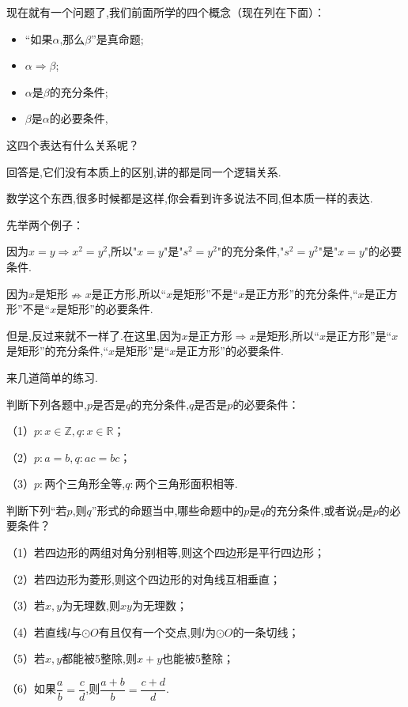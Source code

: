 \documentclass[lang=cn,math=cm,chinesefont=nofont,11pt,scheme=chinese,twocol]{elegantbook}
\begin{document}
现在就有一个问题了,我们前面所学的四个概念（现在列在下面）：
\begin{itemize}
  \item “如果$\alpha$,那么$\beta$”是真命题;
  \item $\alpha\Rightarrow\beta$;
  \item $\alpha$是$\beta$的充分条件;
  \item $\beta$是$\alpha$的必要条件,
\end{itemize}

这四个表达有什么关系呢？

回答是,它们没有本质上的区别,讲的都是同一个逻辑关系.

数学这个东西,很多时候都是这样,你会看到许多说法不同,但本质一样的表达.

\hspace*{\fill}

先举两个例子：

\begin{example}\label{202406262001}
  因为$x=y\Rightarrow x^2=y^2$,所以"$x=y$"是"$s^2=y^2$"的充分条件,"$s^2=y^2$"是"$x=y$"的必要条件.
\end{example}

\begin{example}\label{202406262002}
  因为$x$是矩形$\nRightarrow x$是正方形,所以“$x$是矩形”不是“$x$是正方形”的充分条件,“$x$是正方形”不是“$x$是矩形”的必要条件.

  但是,反过来就不一样了.在这里,因为$x$是正方形$\Rightarrow x$是矩形,所以“$x$是正方形”是“$x$是矩形”的充分条件,“$x$是矩形”是“$x$是正方形”的必要条件.
\end{example}

来几道简单的练习.

\begin{exercise}\label{202406262010}
  判断下列各题中,$p$是否是$q$的充分条件,$q$是否是$p$的必要条件：

  （1）$p:x\in\mathbb{Z},q:x\in\mathbb{R}$；

  （2）$p:a=b,q:ac=bc$；

  （3）$p:$两个三角形全等,$q:$两个三角形面积相等.
\end{exercise}

\begin{exercise}\label{202406262101}
  判断下列“若$p$,则$q$”形式的命题当中,哪些命题中的$p$是$q$的充分条件,或者说$q$是$p$的必要条件？

  （1）若四边形的两组对角分别相等,则这个四边形是平行四边形；

  （2）若四边形为菱形,则这个四边形的对角线互相垂直；

  （3）若$x,y$为无理数,则$xy$为无理数；

  （4）若直线$l$与$\odot O$有且仅有一个交点,则$l$为$\odot O$的一条切线；

  （5）若$x,y$都能被5整除,则$x+y$也能被5整除；

  \begin{spacing}{2.0}
    （6）如果$\dfrac{a}{b}=\dfrac{c}{d}$,则$\dfrac{a+b}{b}=\dfrac{c+d}{d}$.
  \end{spacing}
\end{exercise}
\end{document}
